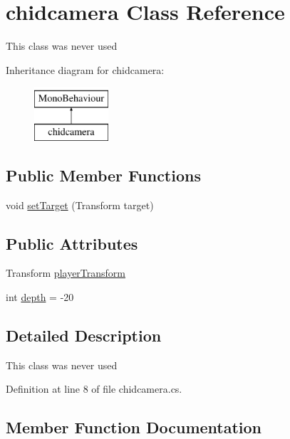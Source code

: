\hypertarget{classchidcamera}{}\section{chidcamera Class Reference}
\label{classchidcamera}


This class was never used  


Inheritance diagram for chidcamera\+:\begin{figure}[H]
\begin{center}
\leavevmode
\includegraphics[height=2.000000cm]{classchidcamera}
\end{center}
\end{figure}
\subsection*{Public Member Functions}
\begin{DoxyCompactItemize}
\item 
void \mbox{\hyperlink{classchidcamera_ac88bd1bfacef55bb9a88a91d648de2aa}{set\+Target}} (Transform target)
\end{DoxyCompactItemize}
\subsection*{Public Attributes}
\begin{DoxyCompactItemize}
\item 
Transform \mbox{\hyperlink{classchidcamera_a8adbef10036b8431e2601b5b895392cf}{player\+Transform}}
\item 
int \mbox{\hyperlink{classchidcamera_abf48941307b13b49b9a0aafefb36cd5c}{depth}} = -\/20
\end{DoxyCompactItemize}


\subsection{Detailed Description}
This class was never used 



Definition at line 8 of file chidcamera.\+cs.



\subsection{Member Function Documentation}
\mbox{\label{classchidcamera_ac88bd1bfacef55bb9a88a91d648de2aa}} 
